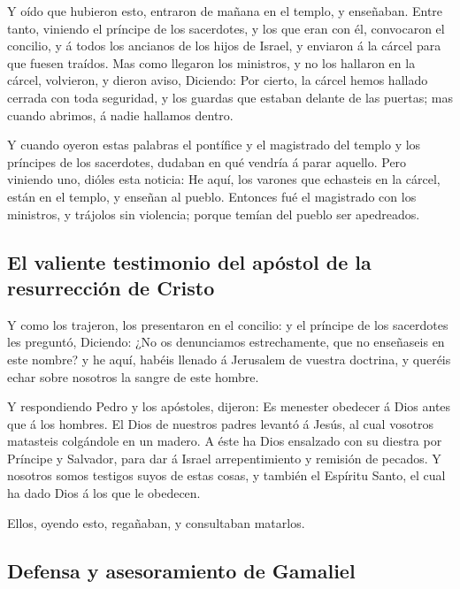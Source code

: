  Y oído que hubieron esto, entraron de mañana en el
templo, y enseñaban. Entre tanto, viniendo el príncipe de los
sacerdotes, y los que eran con él, convocaron el concilio, y á todos los
ancianos de los hijos de Israel, y enviaron á la cárcel para que fuesen
traídos.  Mas como llegaron los ministros, y no los
hallaron en la cárcel, volvieron, y dieron aviso, 
Diciendo: Por cierto, la cárcel hemos hallado cerrada con toda
seguridad, y los guardas que estaban delante de las puertas; mas cuando
abrimos, á nadie hallamos dentro.

 Y cuando oyeron estas palabras el pontífice y el
magistrado del templo y los príncipes de los sacerdotes, dudaban en qué
vendría á parar aquello.  Pero viniendo uno, dióles esta
noticia: He aquí, los varones que echasteis en la cárcel, están en el
templo, y enseñan al pueblo.  Entonces fué el magistrado
con los ministros, y trájolos sin violencia; porque temían del pueblo
ser apedreados.

\hypertarget{el-valiente-testimonio-del-apuxf3stol-de-la-resurrecciuxf3n-de-cristo}{%
\subsection{El valiente testimonio del apóstol de la resurrección de
Cristo}\label{el-valiente-testimonio-del-apuxf3stol-de-la-resurrecciuxf3n-de-cristo}}

 Y como los trajeron, los presentaron en el concilio: y
el príncipe de los sacerdotes les preguntó,  Diciendo:
¿No os denunciamos estrechamente, que no enseñaseis en este nombre? y he
aquí, habéis llenado á Jerusalem de vuestra doctrina, y queréis echar
sobre nosotros la sangre de este hombre.

 Y respondiendo Pedro y los apóstoles, dijeron: Es
menester obedecer á Dios antes que á los hombres.  El
Dios de nuestros padres levantó á Jesús, al cual vosotros matasteis
colgándole en un madero.  A éste ha Dios ensalzado con su
diestra por Príncipe y Salvador, para dar á Israel arrepentimiento y
remisión de pecados.  Y nosotros somos testigos suyos de
estas cosas, y también el Espíritu Santo, el cual ha dado Dios á los que
le obedecen.

 Ellos, oyendo esto, regañaban, y consultaban matarlos.

\hypertarget{defensa-y-asesoramiento-de-gamaliel}{%
\subsection{Defensa y asesoramiento de
Gamaliel}\label{defensa-y-asesoramiento-de-gamaliel}}

